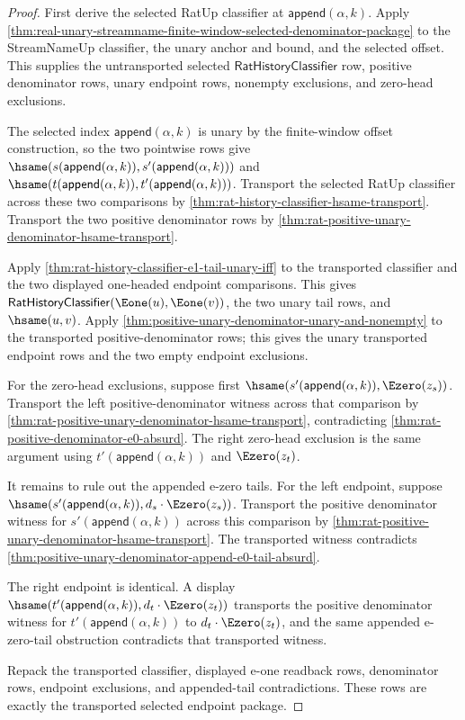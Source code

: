 \begin{proof}
First derive the selected RatUp classifier at
$\mathsf{append}(\alpha,k)$. Apply
\autoref{thm:real-unary-streamname-finite-window-selected-denominator-package}
to the StreamNameUp classifier, the unary anchor and bound, and the selected
offset. This supplies the untransported selected
$\mathsf{RatHistoryClassifier}$ row, positive denominator rows, unary endpoint
rows, nonempty exclusions, and zero-head exclusions.

The selected index $\mathsf{append}(\alpha,k)$ is unary by the finite-window
offset construction, so the two pointwise rows give
$\hsame(s(\mathsf{append}(\alpha,k)),s'(\mathsf{append}(\alpha,k)))$ and
$\hsame(t(\mathsf{append}(\alpha,k)),t'(\mathsf{append}(\alpha,k)))$.
Transport the selected RatUp classifier across these two comparisons by
\autoref{thm:rat-history-classifier-hsame-transport}. Transport the two
positive denominator rows by
\autoref{thm:rat-positive-unary-denominator-hsame-transport}.

Apply \autoref{thm:rat-history-classifier-e1-tail-unary-iff} to the transported
classifier and the two displayed one-headed endpoint comparisons. This gives
$\mathsf{RatHistoryClassifier}(\Eone(u),\Eone(v))$, the two unary tail rows,
and $\hsame(u,v)$. Apply
\autoref{thm:positive-unary-denominator-unary-and-nonempty} to the transported
positive-denominator rows; this gives the unary transported endpoint rows and
the two empty endpoint exclusions.

For the zero-head exclusions, suppose first
$\hsame(s'(\mathsf{append}(\alpha,k)),\Ezero(z_s))$. Transport the left
positive-denominator witness across that comparison by
\autoref{thm:rat-positive-unary-denominator-hsame-transport}, contradicting
\autoref{thm:rat-positive-denominator-e0-absurd}. The right zero-head exclusion
is the same argument using $t'(\mathsf{append}(\alpha,k))$ and $\Ezero(z_t)$.

It remains to rule out the appended e-zero tails. For the left endpoint,
suppose
$\hsame(s'(\mathsf{append}(\alpha,k)),d_s\cdot\Ezero(z_s))$. Transport the
positive denominator witness for $s'(\mathsf{append}(\alpha,k))$ across this
comparison by \autoref{thm:rat-positive-unary-denominator-hsame-transport}.
The transported witness contradicts
\autoref{thm:positive-unary-denominator-append-e0-tail-absurd}.

The right endpoint is identical. A display
$\hsame(t'(\mathsf{append}(\alpha,k)),d_t\cdot\Ezero(z_t))$ transports the
positive denominator witness for $t'(\mathsf{append}(\alpha,k))$ to
$d_t\cdot\Ezero(z_t)$, and the same appended e-zero-tail obstruction
contradicts that transported witness.

Repack the transported classifier, displayed e-one readback rows, denominator
rows, endpoint exclusions, and appended-tail contradictions. These rows are
exactly the transported selected endpoint package.
\end{proof}

